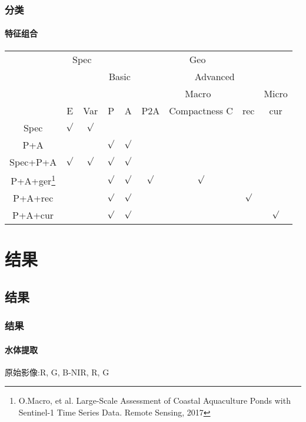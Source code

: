 \documentclass[10pt]{beamer}
\begin{document}
\begin{frame}
	\frametitle{分类}
	\framesubtitle{特征组合}
	\begin{table}[htbp]
		\small
		\centering
		\begin{tabular}{ccccccccc}
			\toprule
			& \multicolumn{2}{c}{Spec}& \multicolumn{6}{c}{Geo}\\ 
			\cmidrule(lr){2-3} \cmidrule(lr){4-9}
			&   &   & \multicolumn{2}{c}{Basic}&\multicolumn{4}{c}{Advanced}\\ 
			\cmidrule(lr){4-5} \cmidrule(lr){6-9}
			&   &   &   &   & \multicolumn{3}{c}{Macro}&Micro\\
			\cmidrule(lr){6-8} \cmidrule(lr){9-9}
			& E &Var	&P &A &P2A &Compactness C &rec &cur \\ \midrule
			Spec&$\surd$&$\surd$&   &   &   &    & &\\
			P+A&	&		& $\surd$ & $\surd$   &   &  &    &\\
			Spec+P+A&$\surd$&$\surd$& $\surd$ & $\surd$   &   &  &    &\\
			P+A+ger\footnote{O.Macro, et al. Large-Scale Assessment of Coastal Aquaculture
				Ponds with Sentinel-1 Time Series Data. Remote Sensing, 2017}&	&		& $\surd$ & $\surd$   &$\surd$&$\surd$&    &\\
			P+A+rec&	&		& $\surd$ & $\surd$   &   &  &$\surd$     &\\
			P+A+cur&	&		& $\surd$ & $\surd$   &   &  &    &$\surd$ \\ \bottomrule
		\end{tabular}
		\label{feature_combine}
	\end{table}
\end{frame}

\section{结果}
\subsection{结果}

\begin{frame}
	\frametitle{结果}
	\framesubtitle{水体提取}
	原始影像:R, G, B-NIR, R, G
	\begin{figure}
		\setcounter{subfigure}{0}
		\small
		\centering
	\end{figure}
\end{frame}
\end{document}
